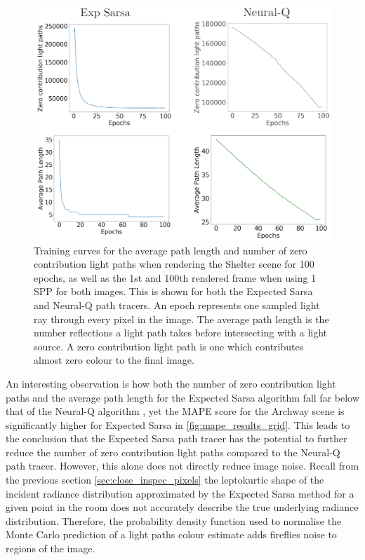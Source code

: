 \documentclass[../dissertation.tex]{subfiles}
\begin{document}
\begin{figure}[h]
\begin{center}
\includegraphics[width=\textwidth]{images/training_curves.png}    
\end{center}
\caption{Training curves for the average path length and number of zero contribution light paths when rendering the Shelter scene for 100 epochs, as well as the 1st and 100th rendered frame when using 1 SPP for both images. This is shown for both the Expected Sarsa and Neural-Q path tracers. An epoch represents one sampled light ray through every pixel in the image. The average path length is the number reflections a light path takes before intersecting with a light source. A zero contribution light path is one which contributes almost zero colour to the final image.}
\label{fig:training_curves_archway}
\end{figure}

An interesting observation is how both the number of zero contribution light paths and the average path length for the Expected Sarsa algorithm fall far below that of the Neural-Q algorithm , yet the MAPE score for the Archway scene is significantly higher for Expected Sarsa in \ref{fig:mape_results_grid}. This leads to the conclusion that the Expected Sarsa path tracer has the potential to further reduce the number of zero contribution light paths compared to the Neural-Q path tracer. However, this alone does not directly reduce image noise. Recall from the previous section \ref{sec:close_inspec_pixels} the leptokurtic shape of the incident radiance distribution approximated by the Expected Sarsa method for a given point in the room does not accurately describe the true underlying radiance distribution. Therefore, the probability density function used to normalise the Monte Carlo prediction of a light paths colour estimate adds fireflies noise to regions of the image.\\
\end{document}
